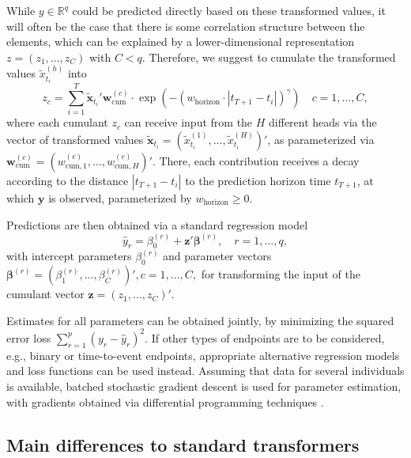 \documentclass[AMA,Times1COL]{WileyNJDv5} %
\begin{document}
While $y \in \mathbb{R}^{q}$ could be predicted directly based on these transformed values, it will often be the case that there is some correlation structure between the elements, which can be explained by a lower-dimensional representation $z = (z_1, \ldots, z_C)$ with $C < q$. Therefore, we suggest to cumulate the transformed values $\tilde{x}_{t_i}^{(h)}$ into
\begin{equation}\label{eq:cumulant}
z_c = \sum_{i=1}^T \tilde{\mathbf{x}}_{t_i}' \mathbf{w}_{\mathrm{cum}}^{(c)} \cdot \exp{\left(-(w_{\mathrm{horizon}}\cdot|t_{T+1} - t_i|)^\gamma\right)} \quad c=1,\dots,C,
\end{equation}
where each cumulant $z_c$ can receive input from the $H$ different heads via the vector of transformed values $\tilde{\mathbf{x}}_{t_i} = (\tilde{x}_{t_i}^{(1)}, \ldots, \tilde{x}_{t_i}^{(H)})' $, as parameterized via $\mathbf{w}_{\text{cum}}^{(c)} = (w_{\mathrm{cum},1}^{(c)}, \ldots, w_{\mathrm{cum}, H}^{(c)})' $. There, each contribution receives a decay according to the distance $|t_{T+1}-t_i|$ to the prediction horizon time $t_{T+1}$, at which $\mathbf{y}$ is observed, parameterized by $w_{\mathrm{horizon}} \geq 0$.

Predictions are then obtained via a standard regression model
\begin{equation}
\label{eq:output}
\hat{y}_r = \beta_0^{(r)} + \mathbf{z}'\boldsymbol\beta^{(r)}, \quad r = 1,\ldots,q,
\end{equation}
with intercept parameters $\beta_0^{(r)}$ and parameter vectors $\boldsymbol{\beta}^{(r)} = (\beta_1^{(r)}, \ldots, \beta_{C}^{(r)})', c=1,\ldots,C,$ for transforming the input of the cumulant vector $\mathbf{z}=(z_1,\ldots,z_C)'$.

Estimates for all parameters can be obtained jointly, by minimizing the squared error loss $\sum_{r=1}^{p} (y_r - \hat{y}_r)^2$. If other types of endpoints are to be considered, e.g., binary or time-to-event endpoints, appropriate alternative regression models and loss functions can be used instead. Assuming that data for several individuals is available, batched stochastic gradient descent \citep{bottou_large-scale_2010} is used for parameter estimation, with gradients obtained via differential programming techniques \citep{hackenberg_using_2020}.



\subsection{Main differences to standard transformers}
\label{sec:minitransformer_differences}
\end{document}
